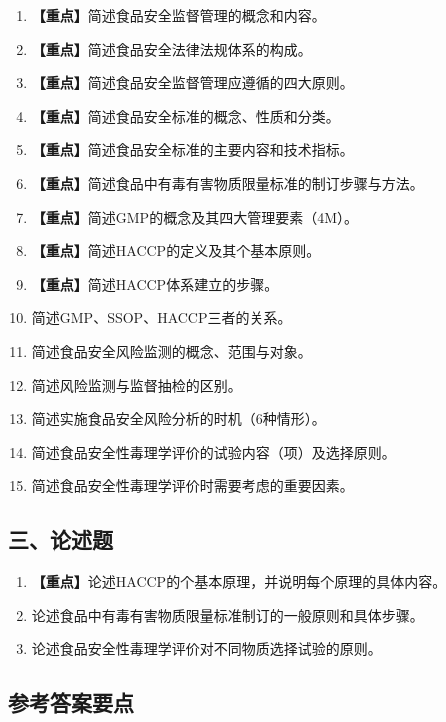 {\begin{enumerate}[leftmargin=*, itemsep=8pt]
    \item \textbf{【重点】}简述食品安全监督管理的概念和内容。
    \item \textbf{【重点】}简述食品安全法律法规体系的构成。
    \item \textbf{【重点】}简述食品安全监督管理应遵循的四大原则。
    \item \textbf{【重点】}简述食品安全标准的概念、性质和分类。
    \item \textbf{【重点】}简述食品安全标准的主要内容和技术指标。
    \item \textbf{【重点】}简述食品中有毒有害物质限量标准的制订步骤与方法。
    \item \textbf{【重点】}简述GMP的概念及其四大管理要素（4M）。
    \item \textbf{【重点】}简述HACCP的定义及其个基本原则。
    \item \textbf{【重点】}简述HACCP体系建立的步骤。
    \item 简述GMP、SSOP、HACCP三者的关系。
    \item 简述食品安全风险监测的概念、范围与对象。
    \item 简述风险监测与监督抽检的区别。
    \item 简述实施食品安全风险分析的时机（6种情形）。
    \item 简述食品安全性毒理学评价的试验内容（项）及选择原则。
    \item 简述食品安全性毒理学评价时需要考虑的重要因素。
\end{enumerate}

\subsection*{三、论述题}

\begin{enumerate}[leftmargin=*, itemsep=8pt]
    \item \textbf{【重点】}论述HACCP的个基本原理，并说明每个原理的具体内容。
    \item 论述食品中有毒有害物质限量标准制订的一般原则和具体步骤。
    \item 论述食品安全性毒理学评价对不同物质选择试验的原则。
\end{enumerate}

\subsection*{参考答案要点}

}
